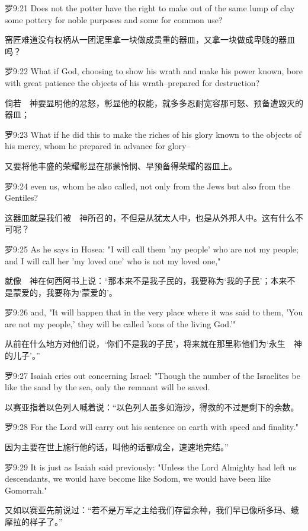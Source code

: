 \documentclass[a4paper,11pt,onecolumn,twoside]{ctexart}
\begin{document}
\begin{multicols}{2}
 罗9:21
 Does not the potter have the right to make out of the same lump of clay some pottery for noble purposes and some for common use?

 窑匠难道没有权柄从一团泥里拿一块做成贵重的器皿，又拿一块做成卑贱的器皿吗？


 罗9:22
 What if God, choosing to show his wrath and make his power known, bore with great patience the objects of his wrath--prepared for destruction?

 倘若　神要显明他的忿怒，彰显他的权能，就多多忍耐宽容那可怒、预备遭毁灭的器皿；


 罗9:23
 What if he did this to make the riches of his glory known to the objects of his mercy, whom he prepared in advance for glory--

 又要将他丰盛的荣耀彰显在那蒙怜悯、早预备得荣耀的器皿上。


 罗9:24
 even us, whom he also called, not only from the Jews but also from the Gentiles?

 这器皿就是我们被　神所召的，不但是从犹太人中，也是从外邦人中。这有什么不可呢？


 罗9:25
 As he says in Hosea: "I will call them 'my people' who are not my people; and I will call her 'my loved one' who is not my loved one,"

 就像　神在何西阿书上说：“那本来不是我子民的，我要称为‘我的子民’；本来不是蒙爱的，我要称为‘蒙爱的’。


 罗9:26
 and, "It will happen that in the very place where it was said to them, 'You are not my people,' they will be called 'sons of the living God.'"

 从前在什么地方对他们说，‘你们不是我的子民’，将来就在那里称他们为‘永生　神的儿子’。”


 罗9:27
 Isaiah cries out concerning Israel: "Though the number of the Israelites be like the sand by the sea, only the remnant will be saved.

 以赛亚指着以色列人喊着说：“以色列人虽多如海沙，得救的不过是剩下的余数。


 罗9:28
 For the Lord will carry out his sentence on earth with speed and finality."

 因为主要在世上施行他的话，叫他的话都成全，速速地完结。”


 罗9:29
 It is just as Isaiah said previously: "Unless the Lord Almighty had left us descendants, we would have become like Sodom, we would have been like Gomorrah."

 又如以赛亚先前说过：“若不是万军之主给我们存留余种，我们早已像所多玛、蛾摩拉的样子了。”



\end{multicols}
\end{document}
